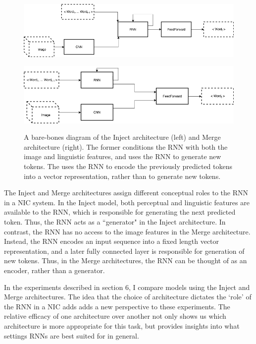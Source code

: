 \documentclass[letterpaper, 10 pt, conference]{ieeeconf}
\begin{document}
\begin{figure}[h]
\centering
\begin{minipage}{.5\textwidth}
  \centering
  \includegraphics[width=.85\linewidth]{inject_scheme}
  \label{fig:test1}
\end{minipage}%
\begin{minipage}{.5\textwidth}
  \centering
  \includegraphics[width=.85\linewidth]{merge_scheme}
  \label{fig:test2}
\end{minipage}
\caption{A bare-bones diagram of the Inject architecture (left) and Merge architecture (right). The former conditions the RNN with both the image and linguistic features, and uses the RNN to generate new tokens. The uses the RNN to encode the previously predicted tokens into a vector representation, rather than to generate new tokens.}
\end{figure}

The Inject and Merge architectures assign different conceptual roles to the RNN in a NIC system. In the Inject model, both perceptual and linguistic features are available to the RNN, which is responsible for generating the next predicted token. Thus, the RNN acts as a ``generator" in the Inject architecture. In contrast, the RNN has no access to the image features in the Merge architecture. Instead, the RNN encodes an input sequence into a fixed length vector representation, and a later fully connected layer is responsible for generation of new tokens. Thus, in the Merge architectures, the RNN can be thought of as an encoder, rather than a generator. 

In the experiments described in section 6, I compare models using the Inject and Merge architectures. The idea that the choice of architecture dictates the `role' of the RNN in a NIC adds adds a new perspective to these experiments. The relative efficacy of one architecture over another not only shows us which architecture is more appropriate for this task, but provides insights into what settings RNNs are best suited for in general.  
\end{document}

